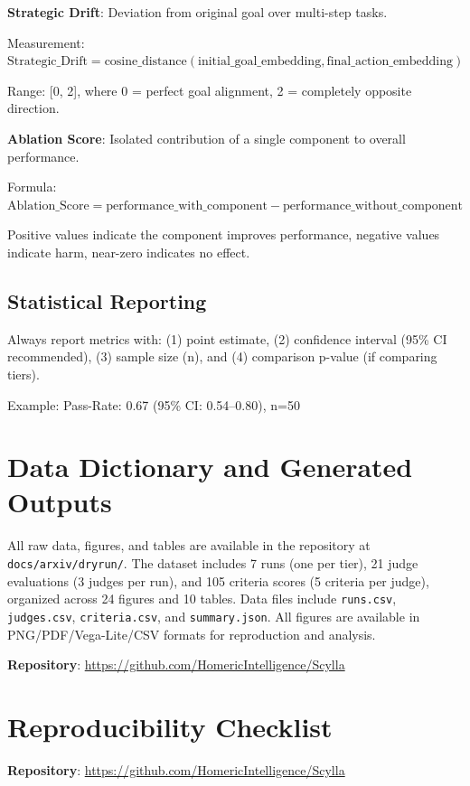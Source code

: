 \documentclass[11pt]{article}
\begin{document}
\textbf{Strategic Drift}: Deviation from original goal over multi-step tasks.

Measurement: $\text{Strategic\_Drift} = \text{cosine\_distance}(\text{initial\_goal\_embedding}, \text{final\_action\_embedding})$

Range: [0, 2], where 0 = perfect goal alignment, 2 = completely opposite direction.

\textbf{Ablation Score}: Isolated contribution of a single component to overall performance.

Formula: $\text{Ablation\_Score} = \text{performance\_with\_component} - \text{performance\_without\_component}$

Positive values indicate the component improves performance, negative values indicate harm, near-zero indicates no effect.

\subsection{Statistical Reporting}

Always report metrics with: (1) point estimate, (2) confidence interval (95\% CI recommended), (3) sample size (n), and (4) comparison p-value (if comparing tiers).

Example: Pass-Rate: 0.67 (95\% CI: 0.54--0.80), n=50

\section{Data Dictionary and Generated Outputs}

All raw data, figures, and tables are available in the repository at \texttt{docs/arxiv/dryrun/}. The dataset includes 7 runs (one per tier), 21 judge evaluations (3 judges per run), and 105 criteria scores (5 criteria per judge), organized across 24 figures and 10 tables. Data files include \texttt{runs.csv}, \texttt{judges.csv}, \texttt{criteria.csv}, and \texttt{summary.json}. All figures are available in PNG/PDF/Vega-Lite/CSV formats for reproduction and analysis.

\textbf{Repository}: \url{https://github.com/HomericIntelligence/Scylla}

\section{Reproducibility Checklist}

\textbf{Repository}: \url{https://github.com/HomericIntelligence/Scylla}
\end{document}
